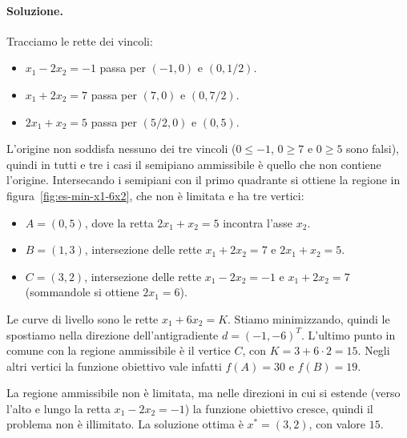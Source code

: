 \paragraph{Soluzione.}
Tracciamo le rette dei vincoli:
\begin{itemize}
    \item $x_1 - 2x_2 = -1$ passa per $(-1, 0)$ e $(0, 1/2)$.
    \item $x_1 + 2x_2 = 7$ passa per $(7, 0)$ e $(0, 7/2)$.
    \item $2x_1 + x_2 = 5$ passa per $(5/2, 0)$ e $(0, 5)$.
\end{itemize}
L'origine non soddisfa nessuno dei tre vincoli ($0 \le -1$, $0 \ge 7$ e $0 \ge 5$ sono falsi), quindi in tutti e tre i casi il semipiano ammissibile è quello che non contiene l'origine. Intersecando i semipiani con il primo quadrante si ottiene la regione in figura~\ref{fig:es-min-x1-6x2}, che non è limitata e ha tre vertici:
\begin{itemize}
    \item $A = (0, 5)$, dove la retta $2x_1 + x_2 = 5$ incontra l'asse $x_2$.
    \item $B = (1, 3)$, intersezione delle rette $x_1 + 2x_2 = 7$ e $2x_1 + x_2 = 5$.
    \item $C = (3, 2)$, intersezione delle rette $x_1 - 2x_2 = -1$ e $x_1 + 2x_2 = 7$ (sommandole si ottiene $2x_1 = 6$).
\end{itemize}

Le curve di livello sono le rette $x_1 + 6x_2 = K$. Stiamo minimizzando, quindi le spostiamo nella direzione dell'antigradiente $d = (-1, -6)^T$. L'ultimo punto in comune con la regione ammissibile è il vertice $C$, con $K = 3 + 6 \cdot 2 = 15$. Negli altri vertici la funzione obiettivo vale infatti $f(A) = 30$ e $f(B) = 19$.

La regione ammissibile non è limitata, ma nelle direzioni in cui si estende (verso l'alto e lungo la retta $x_1 - 2x_2 = -1$) la funzione obiettivo cresce, quindi il problema non è illimitato. La soluzione ottima è $x^* = (3, 2)$, con valore $15$.

